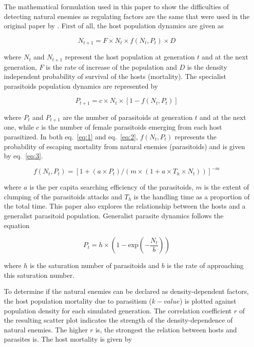\documentclass[10pt,a4paper,onecolumn]{article}
\begin{document}
The mathematical formulation used in this paper to show the difficulties
of detecting natural enemies as regulating factors are the same that
were used in the original paper by \textcite{Hassell85} . First of all,
the host population dynamics are given as

\begin{equation}N_{t+1} = F \times N_t \times f(N_t,P_t) \times D\label{eq:1}\end{equation}

where \(N_t\) and \(N_{t+1}\) represent the host population at
generation \(t\) and at the next generation, \(F\) is the rate of
increase of the population and \(D\) is the density independent
probability of survival of the hosts (mortality). The specialist
parasitoids population dynamics are represented by

\begin{equation}P_{t+1} = c \times N_t \times [1-f(N_t, P_t)]\label{eq:2}\end{equation}

where \(P_t\) and \(P_{t+1}\) are the number of parasitoids at
generation \(t\) and at the next one, while \(c\) is the number of
female parasitoids emerging from each host parasitized. In both
eq.~\ref{eq:1} and eq.~\ref{eq:2}, \(f(N_t,P_t)\) represents the
probability of escaping mortality from natural enemies (parasitoids) and
is given by eq.~\ref{eq:3}.

\begin{equation}f(N_t,P_t) = [1 + (a \times P_t) / (m \times (1 + a \times T_h \times N_t))]^{-m} \label{eq:3}\end{equation}

where \(a\) is the per capita searching efficiency of the parasitoids,
\(m\) is the extent of clumping of the parasitoids attacks and \(T_h\)
is the handling time as a proportion of the total time. This paper also
explores the relationship between the hosts and a generalist parasitoid
population. Generalist parasite dynamics follows the equation

\begin{equation}P_t = h \times \left(1 - \text{exp}\left(-\frac{N_t}{b}\right)\right)\label{eq:4}\end{equation}

where \(h\) is the saturation number of parasitoids and \(b\) is the
rate of approaching this saturation number.

To determine if the natural enemies can be declared as density-dependent
factors, the host population mortality due to parasitism (\(k-value\))
is plotted against population density for each simulated generation. The
correlation coefficient \(r\) of the resulting scatter plot indicates
the strength of the density-dependence of natural enemies. The higher
\(r\) is, the strongest the relation between hosts and parasites is. The
host mortality is given by
\end{document}
